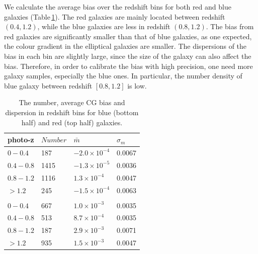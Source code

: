\documentclass[useAMS,usenatbib]{mn2e}
\newcommand{\be}{\begin{equation}}
\newcommand{\ee}{\end{equation}}
\begin{document}

We calculate the average bias over the redshift bins for both red and
blue galaxies (Table\,\ref{table:calibration}). The red galaxies
are mainly located between redshift $(0.4,1.2)$, while the blue galaxies
are less in redshift $(0.8,1.2)$. The bias from red galaxies are
significantly smaller than that of blue galaxies, as one expected, the
colour gradient in the elliptical galaxies are smaller. The
dispersions of the bias in each bin are slightly large, since the size
of the galaxy can also affect the bias. Therefore, in order to
calibrate the bias with high precision, one need more galaxy samples,
especially the blue ones. In particular, the number density of blue
galaxy between redshift $[0.8,1.2]$ is low.


\begin{center}
\begin{table}
  \begin{tabular}{llll}
    \hline
    photo-z    &$Number$  &$\bar{m}$  &$\sigma_m$ \\
    \hline
    $0-0.4$   &187  &$-2.0\times10^{-4}$  &$0.0067$\\
    $0.4-0.8$  &1415 &$-1.3\times10^{-5}$  &$0.0036$\\
    $0.8-1.2$  &1116 &$1.3\times10^{-4}$  &0.0047\\
    $>1.2$  &245  &$-1.5\times10^{-4}$  &0.0063\\
    \\
    $0-0.4$  &667  &$1.0\times10^{-3}$  &0.0035\\
    $0.4-0.8$ &513  &$8.7\times10^{-4}$  &0.0035\\
    $0.8-1.2$ &187  &$2.9\times10^{-3}$  &0.0071\\
    $>1.2$  &935  &$1.5\times10^{-3}$  &0.0047\\
    \hline
  \end{tabular}
  \caption{\label{table:calibration}The number, average CG bias and dispersion in redshift bins for blue (bottom half) and red (top half) galaxies. }
\end{table}
\end{center}

\end{document}
